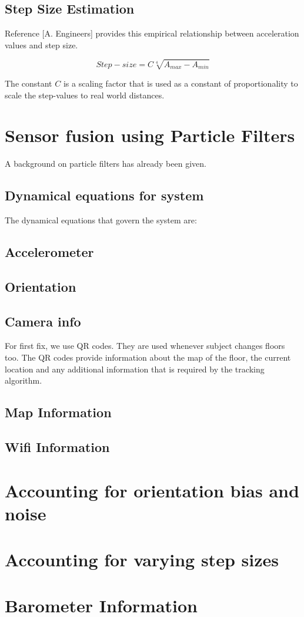 \subsection{Step Size Estimation}

Reference [A. Engineers] provides this empirical relationship between acceleration
values and step size.

\begin{equation}
 Step-size = C \sqrt[4]{A_{max} - A_{min}}
\end{equation}

The constant $C$ is a scaling factor that is used as a constant of proportionality
to scale the step-values to real world distances.

\section{Sensor fusion using Particle Filters}

A background on particle filters has already been given.

\subsection{Dynamical equations for system}

The dynamical equations that govern the system are:



\subsection{Accelerometer}


\subsection{Orientation}

\subsection{Camera info}
For first fix, we use QR codes. They are used whenever subject changes floors too.
The QR codes provide information about the map of the floor, the current location
and any additional information that is required by the tracking algorithm.

\subsection{Map Information}



\subsection{Wifi Information}

\section{Accounting for orientation bias and noise}

\section{Accounting for varying step sizes}

\section{Barometer Information}

